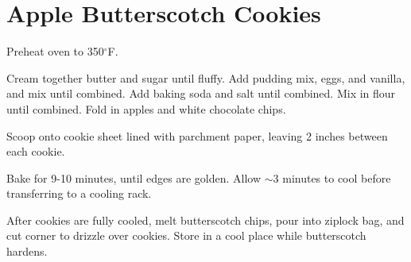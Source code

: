 \section{Apple Butterscotch Cookies}
\begin{recipe}
	
	
	
	Preheat oven to 350$^{\circ}$F.
	
	Cream together butter and sugar until fluffy. Add pudding mix, eggs, and vanilla, and mix until combined. Add baking soda and salt until combined. Mix in flour until combined. Fold in apples and white chocolate chips.
	
	Scoop onto cookie sheet lined with parchment paper, leaving 2 inches between each cookie.
	
	Bake for 9-10 minutes, until edges are golden. Allow $\sim$3 minutes to cool before transferring to a cooling rack.
	

	After cookies are fully cooled, melt butterscotch chips, pour into ziplock bag, and cut corner to drizzle over cookies. Store in a cool place while butterscotch hardens.
	
	
\end{recipe}

